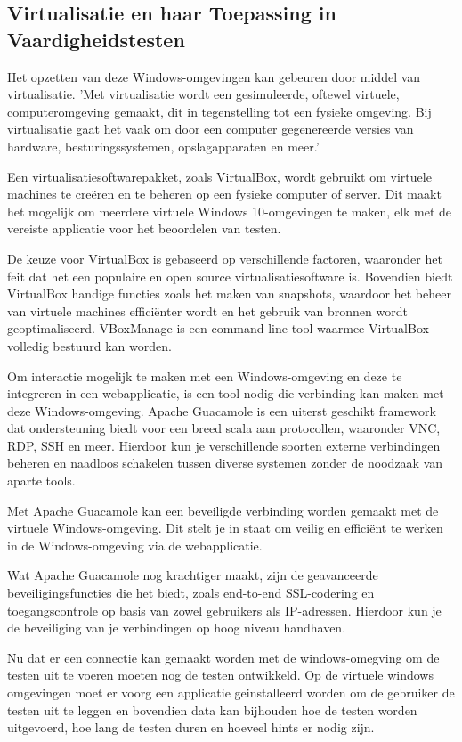 \subsection{Virtualisatie en haar Toepassing in Vaardigheidstesten}
Het opzetten van deze Windows-omgevingen kan gebeuren door middel van virtualisatie. 'Met virtualisatie wordt een gesimuleerde, oftewel virtuele, computeromgeving gemaakt, dit in tegenstelling tot een fysieke omgeving. Bij virtualisatie gaat het vaak om door een computer gegenereerde versies van hardware, besturingssystemen, opslagapparaten en meer.'\autocite{MicrosoftVirtualisationDefinition}

Een virtualisatiesoftwarepakket, zoals VirtualBox, wordt gebruikt om virtuele machines te creëren en te beheren op een fysieke computer of server. Dit maakt het mogelijk om meerdere virtuele Windows 10-omgevingen te maken, elk met de vereiste applicatie voor het beoordelen van testen.

De keuze voor VirtualBox is gebaseerd op verschillende factoren, waaronder het feit dat het een populaire en open source virtualisatiesoftware is. Bovendien biedt VirtualBox handige functies zoals het maken van snapshots, waardoor het beheer van virtuele machines efficiënter wordt en het gebruik van bronnen wordt geoptimaliseerd. VBoxManage is een command-line tool waarmee VirtualBox volledig bestuurd kan worden.


Om interactie mogelijk te maken met een Windows-omgeving en deze te integreren in een webapplicatie, is een tool nodig die verbinding kan maken met deze Windows-omgeving. Apache Guacamole is een uiterst geschikt framework dat ondersteuning biedt voor een breed scala aan protocollen, waaronder VNC, RDP, SSH en meer. Hierdoor kun je verschillende soorten externe verbindingen beheren en naadloos schakelen tussen diverse systemen zonder de noodzaak van aparte tools.

Met Apache Guacamole kan een beveiligde verbinding worden gemaakt met de virtuele Windows-omgeving. Dit stelt je in staat om veilig en efficiënt te werken in de Windows-omgeving via de webapplicatie.

Wat Apache Guacamole nog krachtiger maakt, zijn de geavanceerde beveiligingsfuncties die het biedt, zoals end-to-end SSL-codering en toegangscontrole op basis van zowel gebruikers als IP-adressen. Hierdoor kun je de beveiliging van je verbindingen op hoog niveau handhaven. ~\autocite{ApacheGuacamole}

Nu dat er een connectie kan gemaakt worden met de windows-omegving om de testen uit te voeren moeten nog de testen ontwikkeld. Op de virtuele windows omgevingen moet er voorg een applicatie geinstalleerd worden om de gebruiker de testen uit te leggen en bovendien data kan bijhouden hoe de testen worden uitgevoerd, hoe lang de testen duren en hoeveel hints er nodig zijn. %

